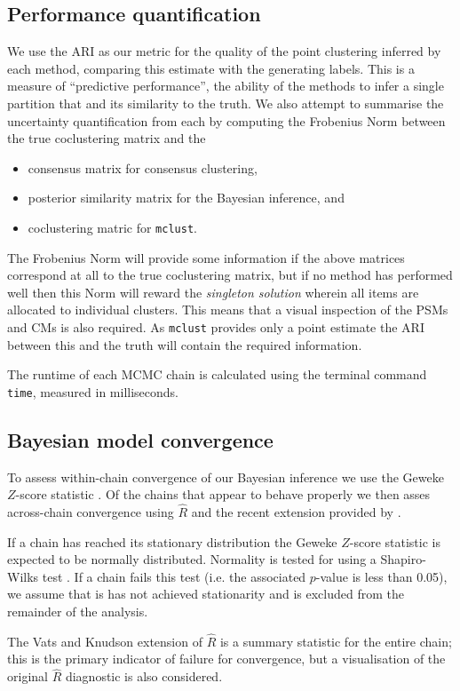 \documentclass{bioinfo}
\begin{document}
\begin{methods}
\subsection{Performance quantification}

We use the ARI as our metric for the quality of the point clustering inferred by each method, comparing this estimate with the generating labels.
This is a measure of ``predictive performance'', the ability of the methods to infer a single partition that and its similarity to the truth. We also attempt to summarise the uncertainty quantification from each by computing the Frobenius Norm between the true coclustering matrix and the 

\begin{itemize}
	\item consensus matrix for consensus clustering,
	\item posterior similarity matrix for the Bayesian inference, and
	\item coclustering matric for \texttt{mclust}.
\end{itemize}
The Frobenius Norm will provide some information if the above matrices correspond at all to the true coclustering matrix, but if no method has performed well then this Norm will reward the \emph{singleton solution} wherein all items are allocated to individual clusters. This means that a visual inspection of  the PSMs and CMs is also required. As \texttt{mclust} provides only a point estimate the ARI between this and the truth will contain the required information.

The runtime of each MCMC chain is calculated using the terminal command \texttt{time}, measured in milliseconds.

\subsection{Bayesian model convergence}
To assess within-chain convergence of our Bayesian inference we use the Geweke $Z$-score statistic \citep{geweke1991evaluating}. Of the chains that appear to behave properly we then asses across-chain convergence using $\hat{R}$ \citep{gelman1992inference} and the recent extension provided by \cite{vats2018revisiting}. 

If a chain has reached its stationary distribution the Geweke $Z$-score statistic is expected to be normally distributed. Normality is tested for using a Shapiro-Wilks test \citep{shapiro1965analysis}. If a chain fails this test (i.e. the associated $p$-value is less than 0.05), we assume that is has not achieved stationarity and is excluded from the remainder of the analysis.

The Vats and Knudson extension of $\hat{R}$ is a summary statistic for the entire chain; this is the primary indicator of failure for convergence, but a visualisation of the original $\hat{R}$ diagnostic is also considered. 
\end{methods}
\end{document}
